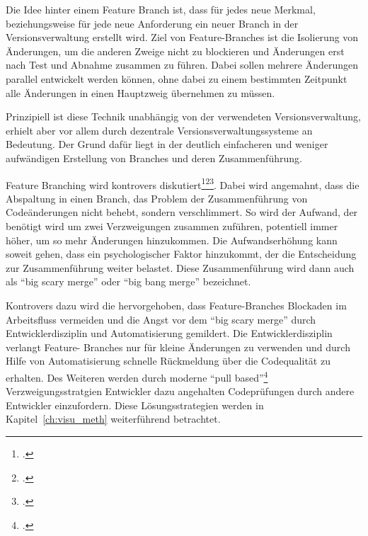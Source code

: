 Die Idee hinter einem Feature Branch ist, dass für jedes neue Merkmal, beziehungsweise für jede neue Anforderung ein 
neuer Branch in der Versionsverwaltung erstellt wird. Ziel von Feature-Branches ist die Isolierung von Änderungen, um die 
anderen Zweige nicht zu blockieren und Änderungen erst nach Test und Abnahme zusammen zu führen. Dabei sollen mehrere 
Änderungen parallel entwickelt werden können, ohne dabei zu einem bestimmten Zeitpunkt alle Änderungen in einen 
Hauptzweig übernehmen zu müssen.

Prinzipiell ist diese Technik unabhängig von der verwendeten Versionsverwaltung, erhielt aber vor allem durch dezentrale 
Versionsverwaltungssysteme an Bedeutung. Der Grund dafür liegt in der deutlich einfacheren und weniger aufwändigen 
Erstellung von Branches und deren Zusammenführung.

Feature Branching wird kontrovers diskutiert\footcite{fowler-feature-branch}\footcite{ci-is-dead}\footcite{fb-revisited}. 
Dabei wird angemahnt, dass die Abspaltung in einen Branch, das Problem der Zusammenführung von Codeänderungen nicht 
behebt, sondern verschlimmert. So wird der Aufwand, der benötigt wird um zwei Verzweigungen zusammen zuführen, potentiell 
immer höher, um so mehr Änderungen hinzukommen. Die Aufwandserhöhung kann soweit gehen, dass ein psychologischer Faktor 
hinzukommt, der die Entscheidung zur Zusammenführung weiter belastet. Diese Zusammenführung wird dann auch als ``big 
scary merge'' oder ``big bang merge'' bezeichnet.

Kontrovers dazu wird die hervorgehoben, dass Feature-Branches Blockaden im Arbeitsfluss vermeiden und die Angst vor dem 
``big scary merge'' durch Entwicklerdisziplin und Automatisierung gemildert. Die Entwicklerdisziplin verlangt Feature-
Branches nur für kleine Änderungen zu verwenden und durch Hilfe von Automatisierung schnelle Rückmeldung über die 
Codequalität zu erhalten. Des Weiteren werden durch moderne ``pull based''\footcite{github-about-pull}
Verzweigungsstratgien Entwickler dazu angehalten Codeprüfungen durch andere Entwickler einzufordern. Diese 
Lösungsstrategien werden in Kapitel~\ref{ch:visu_meth} weiterführend betrachtet.